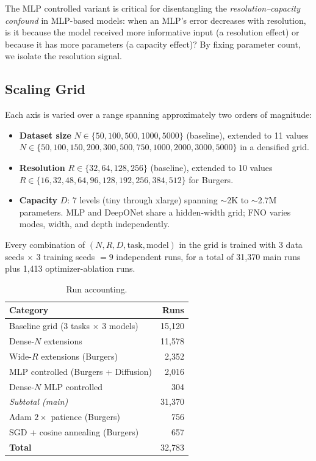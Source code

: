 \documentclass[11pt]{article}
\newcommand{\totalRuns}{32{,}783}
\newcommand{\mainRuns}{31{,}370}
\newcommand{\ablationRuns}{1{,}413}
\begin{document}
The MLP controlled variant is critical for disentangling the
\emph{resolution--capacity confound} in MLP-based models: when
an MLP's error decreases with resolution, is it because the model
received more informative input (a resolution effect) or because it
has more parameters (a capacity effect)?
By fixing parameter count, we isolate the resolution signal.

\subsection{Scaling Grid}
\label{sec:grid}

Each axis is varied over a range spanning approximately two orders of
magnitude:

\begin{itemize}[leftmargin=*,itemsep=2pt]
  \item \textbf{Dataset size} $N \in \{50, 100, 500, 1000, 5000\}$
    (baseline), extended to 11 values
    $N \in \{50, 100, 150, 200, 300, 500, 750, 1000, 2000, 3000, 5000\}$
    in a densified grid.
  \item \textbf{Resolution} $R \in \{32, 64, 128, 256\}$ (baseline),
    extended to 10 values
    $R \in \{16, 32, 48, 64, 96, 128, 192, 256, 384, 512\}$ for
    Burgers.
  \item \textbf{Capacity} $D$: 7 levels (tiny through xlarge) spanning
    $\sim$2K to $\sim$2.7M parameters. MLP and DeepONet share a
    hidden-width grid; FNO varies modes, width, and depth
    independently.
\end{itemize}

Every combination of $(N, R, D, \text{task}, \text{model})$ in the
grid is trained with 3 data seeds $\times$ 3 training seeds $= 9$
independent runs, for a total of \mainRuns{} main runs plus
\ablationRuns{} optimizer-ablation runs.

\begin{table}[h]
\centering
\caption{Run accounting.}
\label{tab:run-accounting}
\begin{tabular}{@{}lr@{}}
\toprule
\textbf{Category} & \textbf{Runs} \\
\midrule
Baseline grid (3 tasks $\times$ 3 models) & 15{,}120 \\
Dense-$N$ extensions & 11{,}578 \\
Wide-$R$ extensions (Burgers) & 2{,}352 \\
MLP controlled (Burgers + Diffusion) & 2{,}016 \\
Dense-$N$ MLP controlled & 304 \\
\midrule
\emph{Subtotal (main)} & \mainRuns{} \\
\midrule
Adam $2\times$ patience (Burgers) & 756 \\
SGD + cosine annealing (Burgers) & 657 \\
\midrule
\textbf{Total} & \totalRuns{} \\
\bottomrule
\end{tabular}
\end{table}
\end{document}
